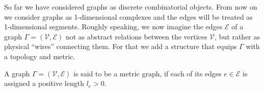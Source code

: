So far we have considered graphs as discrete combinatorial objects. From now on we consider graphs as 1-dimensional complexes and the edges will be treated as 1-dimensional segments. Roughly speaking, we now imagine the edges $\mathcal{E}$ of a graph $\Gamma = (\mathcal{V}, \mathcal{E})$ not as abstract relations between the vertices $\mathcal{V}$, but rather as physical “wires” connecting them. For that we add a structure that equips $\Gamma$ with a topology and metric. 

\begin{definition}\label{metric graph}
    A graph $\Gamma = (\mathcal{V}, \mathcal{E})$ is said to be a metric graph, if each of its edges $e \in \mathcal{E}$ is assigned a positive length $l_e > 0$.
\end{definition}


